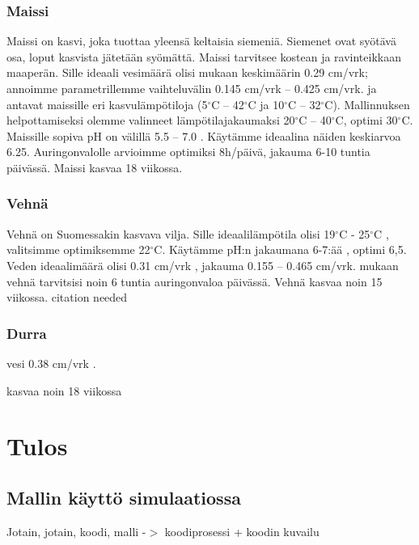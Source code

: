 \documentclass[12pt]{scrreprt}
\begin{document}
  \subsection{Maissi}

  Maissi on kasvi, joka tuottaa yleensä keltaisia siemeniä. Siemenet ovat
  syötävä osa, loput kasvista jätetään syömättä. Maissi tarvitsee kostean ja
  ravinteikkaan maaperän. Sille ideaali vesimäärä olisi \cite{cropwater} mukaan
  keskimäärin 0.29 cm/vrk; annoimme parametrillemme vaihteluvälin 0.145 cm/vrk
  – 0.425 cm/vrk. \cite{ugandamaize} ja \cite{plessismaize} antavat maissille
  eri kasvulämpötiloja (5$^{\circ}$C – 42$^{\circ}$C ja 10$^{\circ}$C –
  32$^{\circ}$C). Mallinnuksen helpottamiseksi olemme valinneet
  lämpötilajakaumaksi 20$^{\circ}$C – 40$^{\circ}$C, optimi 30$^{\circ}$C.
  Maissille sopiva pH on välillä 5.5 – 7.0 \cite{corngrowing}. Käytämme
  ideaalina näiden keskiarvoa 6.25. Auringonvalolle arvioimme optimiksi
  8h/päivä, jakauma 6-10 tuntia päivässä. Maissi kasvaa 18 viikossa.

  \subsection{Vehnä}

  Vehnä on Suomessakin kasvava vilja. Sille ideaalilämpötila olisi 19$^{\circ}$C
  - 25$^{\circ}$C \cite{wheat}, valitsimme optimiksemme 22$^{\circ}$C. Käytämme
  pH:n jakaumana 6-7:ää \cite{wheatfert}, optimi 6,5. Veden ideaalimäärä olisi
  0.31 cm/vrk \cite{cropwater}, jakauma  0.155 – 0.465 cm/vrk. \cite{growwheat}
  mukaan vehnä tarvitsisi noin 6 tuntia auringonvaloa päivässä. Vehnä kasvaa
  noin 15 viikossa. citation needed

  \subsection{Durra}

  vesi 0.38 cm/vrk \cite{cropwater}.

  kasvaa noin 18 viikossa

  \chapter{Tulos}

  \section{Mallin käyttö simulaatiossa}

  Jotain, jotain, koodi, malli -$>$ koodiprosessi + koodin kuvailu
\end{document}
